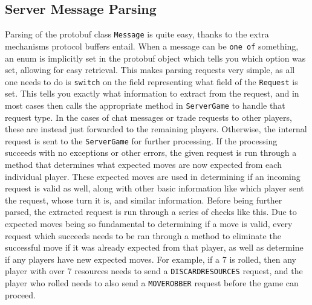 \documentclass[a4paper,doc]{apa6}
\newcommand{\code}{\texttt}
\begin{document}
\subsection{Server Message Parsing}
Parsing of the protobuf class \code{Message} is quite easy, thanks to the extra mechanisms protocol buffers entail. When a message can be \code{one of} something, an enum is implicitly set in the protobuf object which tells you which option was set, allowing for easy retrieval. This makes parsing requests very simple, as all one needs to do is \code{switch} on the field representing what field of the \code{Request} is set. This tells you exactly what information to extract from the request, and in most cases then calls the appropriate method in \code{ServerGame} to handle that request type. In the cases of chat messages or trade requests to other players, these are instead just forwarded to the remaining players. Otherwise, the internal request is sent to the \code{ServerGame} for further processing. If the processing succeeds with no exceptions or other errors, the given request is run through a method that determines what expected moves are now expected from each individual player. These expected moves are used in determining if an incoming request is valid as well, along with other basic information like which player sent the request, whose turn it is, and similar information. Before being further parsed, the extracted request is run through a series of checks like this. Due to expected moves being so fundamental to determining if a move is valid, every request  which succeeds needs to be ran through a method to eliminate the successful move if it was already expected from that player, as well as determine if any players have new expected moves. For example, if a 7 is rolled, then any player with over 7 resources needs to send a \code{DISCARDRESOURCES} request, and the player who rolled needs to also send a \code{MOVEROBBER} request before the game can proceed.
\end{document}
